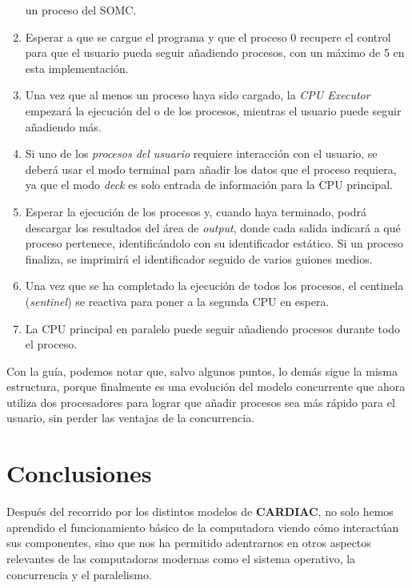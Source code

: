\documentclass[letterpaper,12pt,oneside]{book}
\begin{document}
\begin{enumerate}
				un proceso del SOMC.
				\item Esperar a que se cargue el programa y que el proceso 0 recupere el control para que el usuario pueda
				seguir añadiendo procesos, con 
				un
				máximo de 5 en esta implementación.
				\item Una vez que al menos un proceso haya sido cargado, la \textit{CPU Executor} empezará la ejecución del o de los procesos,
				mientras el usuario puede seguir añadiendo más.
				\item Si uno de los \textit{procesos del usuario} requiere interacción con el usuario, se deberá usar el modo terminal para añadir los
				datos que el proceso requiera, ya que  el modo \textit{deck} es solo entrada de información para la CPU principal.
				\item Esperar la ejecución de los procesos y, cuando haya terminado, podrá descargar los resultados del área de \textit{output}, 
				donde cada salida indicará a qué proceso pertenece, identificándolo con su identificador estático.
				Si un proceso finaliza, se imprimirá el identificador
				seguido de varios guiones medios.
				\item Una vez que se ha completado la ejecución de todos los procesos, el centinela (\textit{sentinel})
				 se reactiva para poner a la segunda CPU en espera.
				\item La CPU principal en paralelo puede seguir añadiendo procesos durante todo el proceso.
				
			\end{enumerate}
			
			
			Con la guía, podemos notar que, salvo algunos puntos, lo demás sigue la misma estructura, porque finalmente es una evolución
			del modelo concurrente que ahora utiliza dos procesadores para lograr que añadir procesos sea más rápido para el usuario, sin
			perder las ventajas de la concurrencia.

\chapter{Conclusiones}


			Después del recorrido por los distintos modelos de \textbf{CARDIAC}, no solo hemos aprendido el funcionamiento básico de la computadora
			viendo cómo interactúan sus componentes, sino que nos ha permitido adentrarnos
			en otros aspectos relevantes de las computadoras modernas como
			el sistema operativo, la concurrencia y el paralelismo.
			
\end{document}
